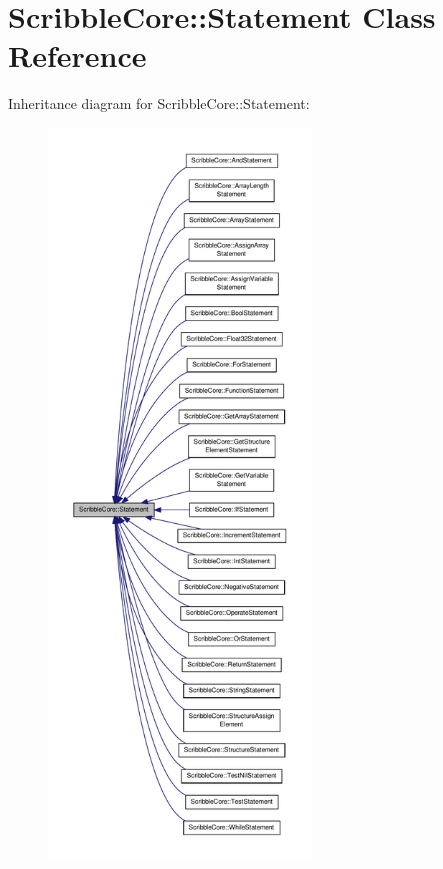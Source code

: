 \hypertarget{class_scribble_core_1_1_statement}{\section{Scribble\-Core\-:\-:Statement Class Reference}
\label{class_scribble_core_1_1_statement}
}


Inheritance diagram for Scribble\-Core\-:\-:Statement\-:\nopagebreak
\begin{figure}[H]
\begin{center}
\leavevmode
\includegraphics[height=550pt]{class_scribble_core_1_1_statement__inherit__graph}
\end{center}
\end{figure}
